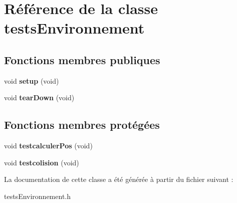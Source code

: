 \hypertarget{classtests_environnement}{}\section{Référence de la classe tests\+Environnement}
\label{classtests_environnement}
\subsection*{Fonctions membres publiques}
\begin{DoxyCompactItemize}
\item 
\mbox{\label{classtests_environnement_abeba28862f0aec281c2fea8ea4a0b4ac}} 
void {\bfseries setup} (void)
\item 
\mbox{\label{classtests_environnement_a328c941f6a50c7dba5eb22fbd2c952c0}} 
void {\bfseries tear\+Down} (void)
\end{DoxyCompactItemize}
\subsection*{Fonctions membres protégées}
\begin{DoxyCompactItemize}
\item 
\mbox{\label{classtests_environnement_ae79caa635d1b58cc453b921797649056}} 
void {\bfseries testcalculer\+Pos} (void)
\item 
\mbox{\label{classtests_environnement_a5d4b7e02dc219f13b240400476767b0d}} 
void {\bfseries testcolision} (void)
\end{DoxyCompactItemize}


La documentation de cette classe a été générée à partir du fichier suivant \+:\begin{DoxyCompactItemize}
\item 
tests\+Environnement.\+h\end{DoxyCompactItemize}
